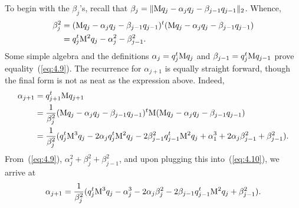 To begin with the $\beta_j$'s, recall that 
$\beta_j = \|\mathrm{M} q_j - \alpha_jq_j - \beta_{j-1}q_{j-1}\|_2$. 
Whence,
\begin{align}
\label{eq:4.9}
\beta_j^2 &= (\mathrm{M} q_j - \alpha_jq_j - \beta_{j-1}q_{j-1})^t(\mathrm{M} q_j - \alpha_jq_j - \beta_{j-1}q_{j-1})\nonumber\\
&= q_j^t\mathrm{M}^2 q_j - \alpha_j^2 - \beta^2_{j-1}.
\end{align}
Some simple algebra and the definitions $\alpha_j = q_j^t\mathrm{M} q_j$ and
$\beta_{j-1} = q_j^t \mathrm{M} q_{j-1}$ prove equality~(\ref{eq:4.9}).  The
%
%
%
%
recurrence for $\alpha_{j+1}$ is equally straight forward, though the final form
is not as neat as the expression above. Indeed,
\begin{align}
\label{eq:4.10}
\alpha_{j+1} &= q_{j+1}^t \mathrm{M} q_{j+1} \nonumber\\
&= \frac{1}{\beta_j^2}(\mathrm{M} q_j - \alpha_j q_j - \beta_{j-1} q_{j-1})^t\mathrm{M} 
  (\mathrm{M} q_j - \alpha_j q_j - \beta_{j-1} q_{j-1})\nonumber\\
&= \frac{1}{\beta_j^2}(q_j^t\mathrm{M}^3 q_j 
    - 2\alpha_j q_j^t\mathrm{M}^2 q_j 
    - 2\beta^2_{j-1} q_{j-1}^t\mathrm{M}^2 q_j 
    + \alpha_1^3
    + 2\alpha_j \beta^2_{j-1} + \beta^2_{j-1}).
\end{align}
From~(\ref{eq:4.9}), $\alpha_j^2 +\beta_j^2 + \beta^2_{j-1}$,
and upon plugging this into~(\ref{eq:4.10}), we arrive at 
\begin{equation}
\label{eq:4.11}
\alpha_{j+1}= \frac{1}{\beta_j^2}(q_j^t\mathrm{M}^3 q_j 
    - \alpha_j^3
    - 2\alpha_j\beta^2_{j}
    - 2\beta_{j-1}q_{j-1}^t\mathrm{M}^2q_j + \beta^2_{j-1}).
\end{equation}

